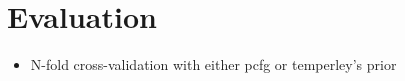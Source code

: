 \section{Evaluation}
\label{sec:evaluation}

\begin{itemize}
\item N-fold cross-validation with either pcfg or temperley's prior
\end{itemize}